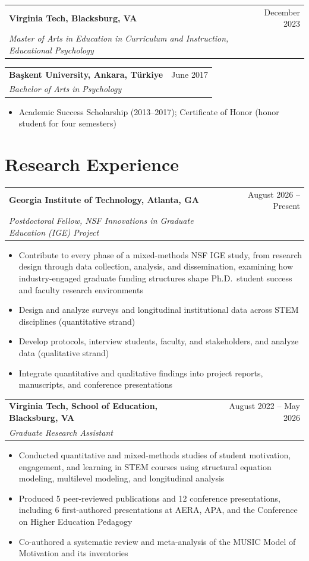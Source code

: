 \documentclass[letterpaper,11pt]{article}
\makeatletter
\newcommand{\entry}[4]{%
  \begin{tabular*}{\linewidth}[t]{@{}l@{\extracolsep{\fill}}r@{}}
    \textbf{#1} & #2 \\
    \textit{#3} & \textit{#4} \\
  \end{tabular*}\par\vspace{1pt}}
\newenvironment{bullets}%
  {\begin{itemize}[leftmargin=1.2em, itemsep=0pt, parsep=0pt, topsep=1pt, label=\textbullet]}%
  {\end{itemize}\vspace{2pt}}
\makeatother
\begin{document}
\entry{Virginia Tech, Blacksburg, VA}{December 2023}
      {Master of Arts in Education in Curriculum and Instruction, Educational Psychology}{}

\entry{Başkent University, Ankara, Türkiye}{June 2017}
      {Bachelor of Arts in Psychology}{}
\begin{bullets}
  \item Academic Success Scholarship (2013--2017); Certificate of Honor (honor student for four semesters)
\end{bullets}

\section{Research Experience}
\entry{Georgia Institute of Technology, Atlanta, GA}{August 2026 -- Present}
      {Postdoctoral Fellow, NSF Innovations in Graduate Education (IGE) Project}{}
\begin{bullets}
  \item Contribute to every phase of a mixed-methods NSF IGE study, from research design through data collection, analysis, and dissemination, examining how industry-engaged graduate funding structures shape Ph.D.\ student success and faculty research environments
  \item Design and analyze surveys and longitudinal institutional data across STEM disciplines (quantitative strand)
  \item Develop protocols, interview students, faculty, and stakeholders, and analyze data (qualitative strand)
  \item Integrate quantitative and qualitative findings into project reports, manuscripts, and conference presentations
\end{bullets}

\entry{Virginia Tech, School of Education, Blacksburg, VA}{August 2022 -- May 2026}
      {Graduate Research Assistant}{}
\begin{bullets}
  \item Conducted quantitative and mixed-methods studies of student motivation, engagement, and learning in STEM courses using structural equation modeling, multilevel modeling, and longitudinal analysis
  \item Produced 5 peer-reviewed publications and 12 conference presentations, including 6 first-authored presentations at AERA, APA, and the Conference on Higher Education Pedagogy
  \item Co-authored a systematic review and meta-analysis of the MUSIC Model of Motivation and its inventories
\end{bullets}
\end{document}
